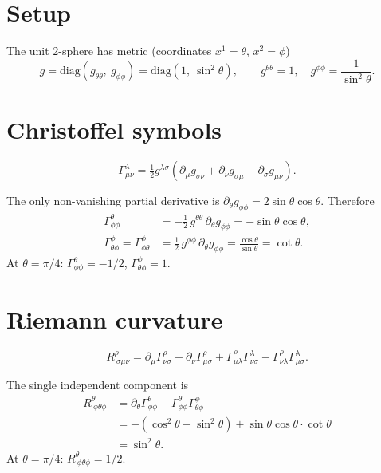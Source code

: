 \documentclass[10pt,twoside,openany]{book}
\begin{document}
\section{Setup}

The unit 2-sphere has metric (coordinates $x^1=\theta$, $x^2=\phi$)
\begin{equation}
g = \mathrm{diag}\!\left(g_{\theta\theta},\ g_{\phi\phi}\right)
  = \mathrm{diag}\!\left(1,\ \sin^2\theta\right),
\qquad g^{\theta\theta}=1,\quad g^{\phi\phi}=\frac{1}{\sin^2\theta}.
\end{equation}

\section{Christoffel symbols}

\begin{equation}
\Gamma^\lambda_{\mu\nu} = \tfrac12 g^{\lambda\sigma}\left(
\partial_\mu g_{\sigma\nu} + \partial_\nu g_{\sigma\mu} - \partial_\sigma g_{\mu\nu}\right).
\end{equation}

The only non-vanishing partial derivative is
$\partial_\theta g_{\phi\phi} = 2\sin\theta\cos\theta$. Therefore
\begin{align}
\Gamma^\theta_{\phi\phi} &= -\tfrac12\, g^{\theta\theta}\, \partial_\theta g_{\phi\phi}
= -\sin\theta\cos\theta, \\
\Gamma^\phi_{\theta\phi} = \Gamma^\phi_{\phi\theta}
&= \tfrac12\, g^{\phi\phi}\, \partial_\theta g_{\phi\phi}
= \frac{\cos\theta}{\sin\theta} = \cot\theta.
\end{align}
At $\theta=\pi/4$: $\Gamma^\theta_{\phi\phi}=-1/2$, $\Gamma^\phi_{\theta\phi}=1$.

\section{Riemann curvature}

\begin{equation}
R^\rho_{\ \sigma\mu\nu} = \partial_\mu\Gamma^\rho_{\nu\sigma}
- \partial_\nu\Gamma^\rho_{\mu\sigma}
+ \Gamma^\rho_{\mu\lambda}\Gamma^\lambda_{\nu\sigma}
- \Gamma^\rho_{\nu\lambda}\Gamma^\lambda_{\mu\sigma}.
\end{equation}

The single independent component is
\begin{align}
R^\theta_{\ \phi\theta\phi}
&= \partial_\theta\Gamma^\theta_{\phi\phi} - \Gamma^\theta_{\phi\phi}\Gamma^\phi_{\theta\phi} \\
&= -\left(\cos^2\theta-\sin^2\theta\right) + \sin\theta\cos\theta\cdot\cot\theta \\
&= \sin^2\theta.
\end{align}
At $\theta=\pi/4$: $R^\theta_{\ \phi\theta\phi}=1/2$.
\end{document}
